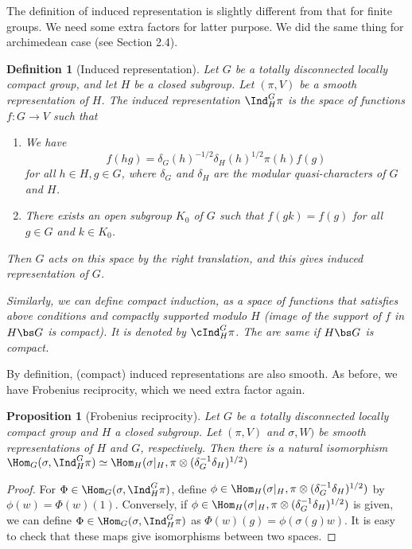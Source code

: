 \documentclass{article}
\newtheorem{definition}{Definition}[section]
\newtheorem{proposition}{Proposition}[section]
\begin{document}
The definition of induced representation is slightly different from that for finite groups. We need some extra factors for latter purpose. We did the same thing for archimedean case (see Section 2.4). 
\begin{definition}[Induced representation]
Let $G$ be a totally disconnected locally compact group, and let $H$ be a closed subgroup. 
Let $(\pi, V)$ be a smooth representation of $H$. The induced representation $\Ind_{H}^{G}\pi$ is the space of functions $f:G\to V$ such that 
\begin{enumerate}
\item We have 
$$
f(hg) = \delta_G(h)^{-1/2} \delta_H(h)^{1/2}\pi(h)f(g)
$$
for all $h\in H, g\in G$, where $\delta_G$ and $\delta_H$ are the modular quasi-characters of $G$ and $H$. 
\item There exists an open subgroup $K_0$ of $G$ such that $f(gk) = f(g)$ for all $g\in G$ and $k\in K_0$. 
\end{enumerate}
Then $G$ acts on this space by the right translation, and this gives induced representation of $G$. 

Similarly, we can define compact induction, as a space of functions that satisfies above conditions and compactly supported modulo $H$ (image of the support of $f$ in $H\bs G$ is compact). It is denoted by $\cInd_{H}^{G}\pi$. The are same if $H\bs G$ is compact. 
\end{definition}
By definition, (compact) induced representations are also smooth. As before, we have Frobenius reciprocity, which we need extra factor again. 

\begin{proposition}[Frobenius reciprocity]
Let $G$ be a totally disconnected locally compact group and $H$ a closed subgroup. 
Let $(\pi, V)$ and $\sigma, W)$ be smooth representations of $H$ and $G$, respectively. 
Then there is a natural isomorphism $\Hom_G(\sigma, \Ind_H^{G}\pi) \simeq \Hom_H(\sigma|_{H}, \pi \otimes (\delta_{G}^{-1}\delta_{H})^{1/2})$
\end{proposition}
\begin{proof}
For $\Phi\in \Hom_G(\sigma, \Ind_{H}^{G}\pi)$, define $\phi\in \Hom_H(\sigma|_{H}, \pi\otimes (\delta_{G}^{-1}\delta_{H})^{1/2})$ by $\phi(w) = \Phi(w)(1)$. 
Conversely, if $\phi\in \Hom_H(\sigma|_{H}, \pi\otimes (\delta_{G}^{-1}\delta_{H})^{1/2})$ is given, we can define $\Phi\in \Hom_G(\sigma, \Ind_{H}^{G}\pi)$ as $\Phi(w)(g) = \phi(\sigma(g)w)$. 
It is easy to check that these maps give isomorphisms between two spaces. 
\end{proof}
\end{document}
